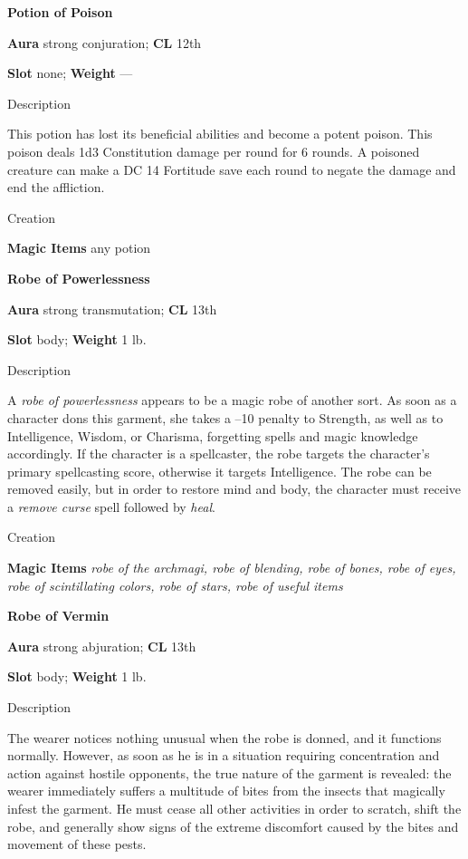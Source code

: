 \textbf{Potion of Poison}
				
\textbf{Aura} strong conjuration; \textbf{CL} 12th
				
\textbf{Slot} none; \textbf{Weight }---
				
Description
				
This potion has lost its beneficial abilities and become a potent poison. This poison deals 1d3 Constitution damage per round for 6 rounds. A poisoned creature can make a DC 14 Fortitude save each round to negate the damage and end the affliction. 
				
Creation
				
\textbf{Magic Items} any potion
				
\textbf{Robe of Powerlessness}
				
\textbf{Aura} strong transmutation; \textbf{CL} 13th
				
\textbf{Slot} body; \textbf{Weight }1 lb.
				
Description
				
A \textit{robe of powerlessness }appears to be a magic robe of another sort. As soon as a character dons this garment, she takes a --10 penalty to Strength, as well as to Intelligence, Wisdom, or Charisma, forgetting spells and magic knowledge accordingly. If the character is a spellcaster, the robe targets the character's primary spellcasting score, otherwise it targets Intelligence. The robe can be removed easily, but in order to restore mind and body, the character must receive a \textit{remove curse }spell followed by \textit{heal}. 
				
Creation
				
\textbf{Magic Items}\textit{ robe of the archmagi, robe of blending, robe of bones, robe of eyes, robe of scintillating colors, robe of stars, robe of useful items}
				
\textbf{Robe of Vermin}
				
\textbf{Aura} strong abjuration; \textbf{CL} 13th
				
\textbf{Slot} body; \textbf{Weight }1 lb.
				
Description
				
The wearer notices nothing unusual when the robe is donned, and it functions normally. However, as soon as he is in a situation requiring concentration and action against hostile opponents, the true nature of the garment is revealed: the wearer immediately suffers a multitude of bites from the insects that magically infest the garment. He must cease all other activities in order to scratch, shift the robe, and generally show signs of the extreme discomfort caused by the bites and movement of these pests.
				
